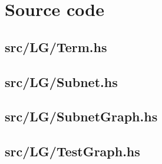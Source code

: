 \documentclass[12pt,a4paper]{article}
\begin{document}
\appendix

\section{Source code}\label{code}

\subsection{src/LG/Term.hs}\label{code:term}

\subsection{src/LG/Subnet.hs}\label{code:net}

\subsection{src/LG/SubnetGraph.hs}\label{code:netgraph}

\subsection{src/LG/TestGraph.hs}\label{code:test}
\end{document}
